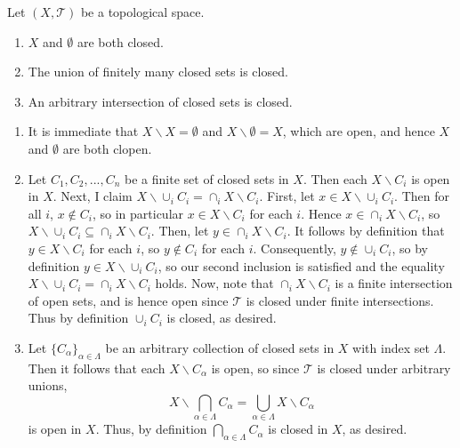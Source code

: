 \documentclass[12pt, a4paper, twoside, openright, titlepage]{book}
\begin{document}
\begin{prop}{}{}
    Let $(X,\mathcal{T})$ be a topological space.\begin{enumerate}
        \item $X$ and $\emptyset$ are both closed.
        \item The union of finitely many closed sets is closed.
        \item An arbitrary intersection of closed sets is closed.
    \end{enumerate}
\end{prop}
\begin{proof*}{}{}
    \leavevmode
    \begin{enumerate}
        \item It is immediate that $X\backslash X = \emptyset$ and $X\backslash \emptyset = X$, which are open, and hence $X$ and $\emptyset$ are both clopen.
        \item Let $C_1,C_2,...,C_n$ be a finite set of closed sets in $X$. Then each $X\backslash C_i$ is open in $X$. Next, I claim $X\backslash \cup_iC_i = \cap_iX\backslash C_i$. First, let $x \in X\backslash \cup_iC_i$. Then for all $i$, $x \notin C_i$, so in particular $x \in X\backslash C_i$ for each $i$. Hence $x \in \cap_iX\backslash C_i$, so $X\backslash \cup_iC_i \subseteq \cap_iX\backslash C_i$. Then, let $y \in \cap_iX\backslash C_i$. It follows by definition that $y \in X\backslash C_i$ for each $i$, so $y \notin C_i$ for each $i$. Consequently, $y \notin \cup_iC_i$, so by definition $y \in X\backslash \cup_iC_i$, so our second inclusion is satisfied and the equality $X\backslash \cup_iC_i = \cap_iX\backslash C_i$ holds. Now, note that $\cap_iX\backslash C_i$ is a finite intersection of open sets, and is hence open since $\mathcal{T}$ is closed under finite intersections. Thus by definition $\cup_iC_i$ is closed, as desired.
        \item Let $\{C_{\alpha}\}_{\alpha \in \Lambda}$ be an arbitrary collection of closed sets in $X$ with index set $\Lambda$. Then it follows that each $X\backslash C_{\alpha}$ is open, so since $\mathcal{T}$ is closed under arbitrary unions, \begin{equation*}
                X\backslash\bigcap_{\alpha \in \Lambda}C_{\alpha} = \bigcup_{\alpha\in\Lambda}X\backslash C_{\alpha}
        \end{equation*}
            is open in $X$. Thus, by definition $\bigcap_{\alpha\in\Lambda}C_{\alpha}$ is closed in $X$, as desired.
    \end{enumerate}
\end{proof*}
\end{document}
